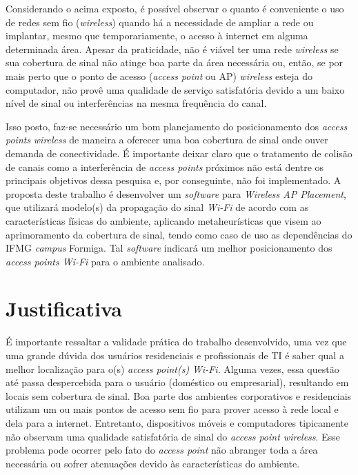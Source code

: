 \documentclass[
	12pt,				%
	twoside,			%
	a4paper,			%
	english,			%
	french,				%
	spanish,			%
	brazil				%
	]{abntex2}
\begin{document}
Considerando o acima exposto, é possível observar o quanto é conveniente
o uso de redes sem fio (\emph{wireless}) quando há a necessidade de
ampliar a rede ou implantar, mesmo que temporariamente, o acesso à
internet em alguma determinada área. Apesar da praticidade, não é viável
ter uma rede \emph{wireless} se sua cobertura de sinal não atinge boa
parte da área necessária ou, então, se por mais perto que o ponto de
acesso (\emph{access point} ou AP) \emph{wireless} esteja do computador,
não provê uma qualidade de serviço satisfatória devido a um baixo nível
de sinal ou interferências na mesma frequência do canal.

Isso posto, faz-se necessário um bom planejamento do posicionamento dos
\emph{access points} \emph{wireless} de maneira a oferecer uma boa
cobertura de sinal onde ouver demanda de conectividade. É importante
deixar claro que o tratamento de colisão de canais como a interferência
de \emph{access points} próximos não está dentre os principais objetivos
dessa pesquisa e, por conseguinte, não foi implementado. A proposta
deste trabalho é desenvolver um \emph{software} para \emph{Wireless AP
Placement}, que utilizará modelo(s) da propagação do sinal \emph{Wi-Fi}
de acordo com as características físicas do ambiente, aplicando
metaheurísticas que visem ao aprimoramento da cobertura de sinal, tendo
como caso de uso as dependências do IFMG \emph{campus} Formiga. Tal
\emph{software} indicará um melhor posicionamento dos \emph{access
points Wi-Fi} para o ambiente analisado.

\section{Justificativa}\label{justificativa}

É importante ressaltar a validade prática do trabalho desenvolvido, uma
vez que uma grande dúvida dos usuários residenciais e profissionais de
TI é saber qual a melhor localização para o(s) \emph{access point(s)}
\emph{Wi-Fi}. Alguma vezes, essa questão até passa despercebida para o
usuário (doméstico ou empresarial), resultando em locais sem cobertura
de sinal. Boa parte dos ambientes corporativos e residenciais utilizam
um ou mais pontos de acesso sem fio para prover acesso à rede local e
dela para a internet. Entretanto, dispositivos móveis e computadores
tipicamente não observam uma qualidade satisfatória de sinal do
\emph{access point wireless}. Esse problema pode ocorrer pelo fato do
\emph{access point} não abranger toda a área necessária ou sofrer
atenuações devido às características do ambiente.
\end{document}
